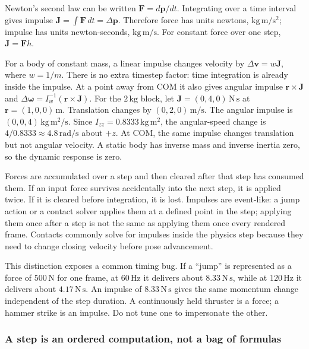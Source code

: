 Newton's second law can be written \(\mathbf F=d\mathbf p/dt\). Integrating over a time interval gives impulse \(\mathbf J=\int\mathbf F\,dt=\Delta\mathbf p\). Therefore force has units newtons, \(\mathrm{kg\,m/s^2}\); impulse has units newton-seconds, \(\mathrm{kg\,m/s}\). For constant force over one step, \(\mathbf J=\mathbf Fh\).

For a body of constant mass, a linear impulse changes velocity by \(\Delta\mathbf v=w\mathbf J\), where \(w=1/m\). There is no extra timestep factor: time integration is already inside the impulse. At a point away from COM it also gives angular impulse \(\mathbf r\times\mathbf J\) and \(\Delta\boldsymbol\omega=I_w^{-1}(\mathbf r\times\mathbf J)\). For the \(2\,\mathrm{kg}\) block, let \(\mathbf J=(0,4,0)\,\mathrm{N\,s}\) at \(\mathbf r=(1,0,0)\,\mathrm m\). Translation changes by \((0,2,0)\,\mathrm{m/s}\). The angular impulse is \((0,0,4)\,\mathrm{kg\,m^2/s}\). Since \(I_{zz}=0.8333\,\mathrm{kg\,m^2}\), the angular-speed change is \(4/0.8333\approx4.8\,\mathrm{rad/s}\) about \(+z\). At COM, the same impulse changes translation but not angular velocity. A static body has inverse mass and inverse inertia zero, so the dynamic response is zero.

Forces are accumulated over a step and then cleared after that step has consumed them. If an input force survives accidentally into the next step, it is applied twice. If it is cleared before integration, it is lost. Impulses are event-like: a jump action or a contact solver applies them at a defined point in the step; applying them once after a step is not the same as applying them once every rendered frame. Contacts commonly solve for impulses inside the physics step because they need to change closing velocity before pose advancement.

This distinction exposes a common timing bug. If a ``jump'' is represented as a force of \(500\,\mathrm N\) for one frame, at \(60\,\mathrm{Hz}\) it delivers about \(8.33\,\mathrm{N\,s}\), while at \(120\,\mathrm{Hz}\) it delivers about \(4.17\,\mathrm{N\,s}\). An impulse of \(8.33\,\mathrm{N\,s}\) gives the same momentum change independent of the step duration. A continuously held thruster is a force; a hammer strike is an impulse. Do not tune one to impersonate the other.

\subsubsection{A step is an ordered computation, not a bag of formulas}\label{a-step-is-an-ordered-computation-not-a-bag-of-formulas}

